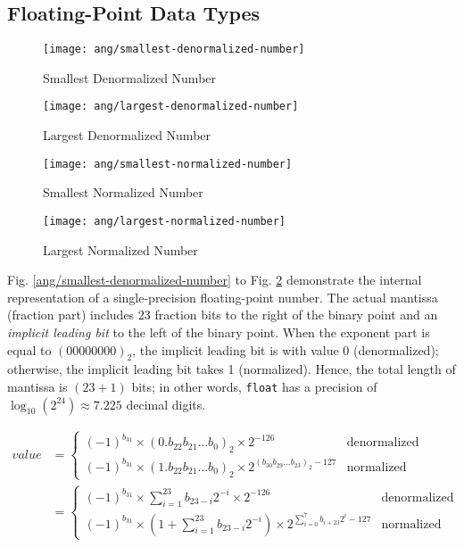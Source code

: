 \subsection{Floating-Point Data Types}
\label{subsection:float-data-type}

\begin{figure}[H]
\begin{minipage}[t]{0.5\linewidth}
\centering
\texttt{[image: ang/smallest-denormalized-number]}
\caption{Smallest Denormalized Number}
\label{ang/smallest-denormalized-number}
\end{minipage}
\begin{minipage}[t]{0.5\linewidth}
\centering
\texttt{[image: ang/largest-denormalized-number]}
\caption{Largest Denormalized Number}
\label{ang/largest-denormalized-number}
\end{minipage}
\end{figure}

\begin{figure}[H]
\begin{minipage}[t]{0.5\linewidth}
\centering
\texttt{[image: ang/smallest-normalized-number]}
\caption{Smallest Normalized Number}
\label{ang/smallest-normalized-number}
\end{minipage}
\begin{minipage}[t]{0.5\linewidth}
\centering
\texttt{[image: ang/largest-normalized-number]}
\caption{Largest Normalized Number}
\label{ang/largest-normalized-number}
\end{minipage}
\end{figure}

Fig. \ref{ang/smallest-denormalized-number} to Fig. \ref{ang/largest-normalized-number} demonstrate the internal representation of a single-precision floating-point number. The actual mantissa (fraction part) includes 23 fraction bits to the right of the binary point and an \textit{implicit leading bit} to the left of the binary point. When the exponent part is equal to $(00000000)_2$, the implicit leading bit is with value 0 (denormalized); otherwise, the implicit leading bit takes 1 (normalized). Hence, the total length of mantissa is $(23 + 1)$ bits; in other words, \texttt{float} has a precision of $\log_{10}(2^{24}) \approx 7.225$ decimal digits.

\begin{align}
value &=
\begin{cases}
(-1)^{b_{31}} \times (0.b_{22}b_{21} \dots b_{0})_2 \times 2^{- 126} &\text{denormalized}\\
(-1)^{b_{31}} \times (1.b_{22}b_{21} \dots b_{0})_2 \times 2^{(b_{30}b_{29} \dots b_{23})_2 - 127} &\text{normalized}
\end{cases}\\
&=
\begin{cases}
\displaystyle(-1)^{b_{31}} \times \sum_{i=1}^{23} b_{23-i} 2^{-i} \times 2^{- 126} &\text{denormalized}\\
\displaystyle(-1)^{b_{31}} \times ( 1 + \sum_{i=1}^{23} b_{23-i} 2^{-i} ) \times 2^{\sum_{i=0}^{7} b_{i+23} 2^i - 127} &\text{normalized}
\end{cases}
\end{align}

